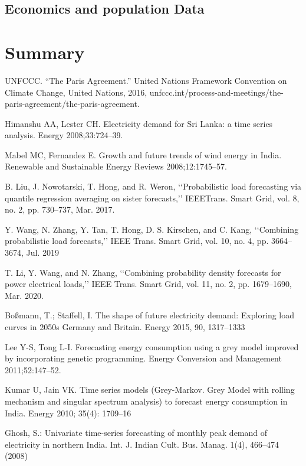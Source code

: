 \documentclass[lettersize,journal]{IEEEtran}
\begin{document}
  \subsection{Economics and population Data}

\section{Summary}

\begin{thebibliography}{1}
  
  UNFCCC. “The Paris Agreement.” United Nations Framework Convention on Climate Change, United Nations, 2016, unfccc.int/process-and-meetings/the-paris-agreement/the-paris-agreement.
  
  Himanshu AA, Lester CH. Electricity demand for Sri Lanka: a time series analysis. Energy 2008;33:724–39.

  Mabel MC, Fernandez E. Growth and future trends of wind energy in India. Renewable and Sustainable Energy Reviews 2008;12:1745–57.

  B. Liu, J. Nowotarski, T. Hong, and R. Weron, ‘‘Probabilistic load forecasting via quantile regression averaging on sister forecasts,’’ IEEETrans. Smart Grid, vol. 8, no. 2, pp. 730–737, Mar. 2017.

  Y. Wang, N. Zhang, Y. Tan, T. Hong, D. S. Kirschen, and C. Kang, ‘‘Combining probabilistic load forecasts,’’ IEEE Trans. Smart Grid, vol. 10, no. 4, pp. 3664–3674, Jul. 2019

  T. Li, Y. Wang, and N. Zhang, ‘‘Combining probability density forecasts for power electrical loads,’’ IEEE Trans. Smart Grid, vol. 11, no. 2, pp. 1679–1690, Mar. 2020.

  Boßmann, T.; Staffell, I. The shape of future electricity demand: Exploring load curves in 2050s Germany and Britain. Energy 2015, 90, 1317–1333

  Lee Y-S, Tong L-I. Forecasting energy consumption using a grey model improved by incorporating genetic programming. Energy Conversion and Management 2011;52:147–52.

  Kumar U, Jain VK. Time series models (Grey-Markov. Grey Model with rolling mechanism and singular spectrum analysis) to forecast energy consumption in India. Energy 2010; 35(4): 1709–16

  Ghosh, S.: Univariate time-series forecasting of monthly peak demand of electricity in northern India. Int. J. Indian Cult. Bus. Manag. 1(4), 466–474 (2008)


\end{thebibliography}
\end{document}
